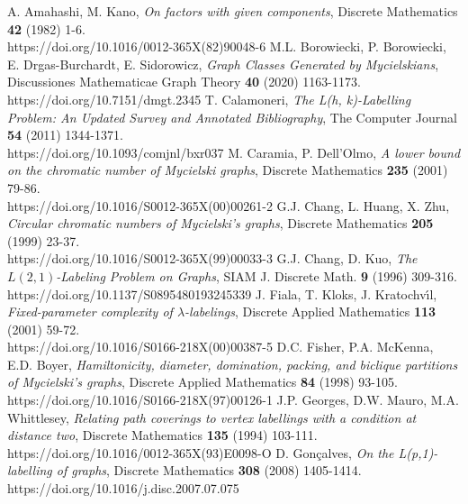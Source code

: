 \documentclass{article}
\newtheorem{open problem} {Open Problem}
\numberwithin{lemma}{section}
\numberwithin{theorem}{section}
\numberwithin{cor}{section}
\numberwithin{prop}{section}
\numberwithin{con}{section}
\numberwithin{claim}{section}
\numberwithin{obs}{section}
\numberwithin{dnt}{section}
\begin{document}
\begin{thebibliography}{99}
 A. Amahashi, M. Kano, \textit{On factors with given components}, Discrete Mathematics \textbf{42}  (1982) 1-6.\\ https://doi.org/10.1016/0012-365X(82)90048-6
 M.L. Borowiecki, P. Borowiecki, E. Drgas-Burchardt, E. Sidorowicz, \textit{Graph Classes Generated by Mycielskians}, Discussiones Mathematicae Graph Theory \textbf{40}  (2020) 1163-1173.\\ https://doi.org/10.7151/dmgt.2345
 T. Calamoneri, \textit{The L(h, k)-Labelling Problem: An Updated Survey and Annotated Bibliography},  The Computer Journal  \textbf{54} (2011) 1344-1371. \\ https://doi.org/10.1093/comjnl/bxr037
	M. Caramia, P. Dell'Olmo, \textit{A lower bound on the chromatic number of Mycielski graphs},  Discrete Mathematics  \textbf{235} (2001) 79-86. \\ https://doi.org/10.1016/S0012-365X(00)00261-2
	G.J. Chang, L. Huang, X. Zhu, \textit{Circular chromatic numbers of Mycielski's graphs}, Discrete Mathematics  \textbf{205} (1999) 23-37. \\ https://doi.org/10.1016/S0012-365X(99)00033-3
	G.J. Chang, D. Kuo, \textit{The $L(2,1)$-Labeling Problem on Graphs}, SIAM J. Discrete Math.  \textbf{9} (1996) 309-316. \\ https://doi.org/10.1137/S0895480193245339	
 J. Fiala, T. Kloks, J. Kratochv\'{\i}l, \textit{Fixed-parameter complexity of $\lambda$-labelings}, Discrete Applied Mathematics \textbf{113} (2001) 59-72. \\ https://doi.org/10.1016/S0166-218X(00)00387-5
 D.C. Fisher, P.A. McKenna, E.D. Boyer, \textit{Hamiltonicity, diameter, domination, packing, and biclique partitions of Mycielski's graphs}, Discrete Applied Mathematics \textbf{84} (1998) 93-105. \\ https://doi.org/10.1016/S0166-218X(97)00126-1
 J.P. Georges, D.W. Mauro, M.A. Whittlesey,  \textit{Relating path coverings to vertex labellings with a condition at distance two}, Discrete Mathematics  \textbf{135} (1994) 103-111. \\ https://doi.org/10.1016/0012-365X(93)E0098-O
 D. Gonçalves,  \textit{On the L(p,1)-labelling of graphs},  Discrete Mathematics \textbf{308} (2008) 1405-1414. \\ https://doi.org/10.1016/j.disc.2007.07.075	

\end{thebibliography}
\end{document}
